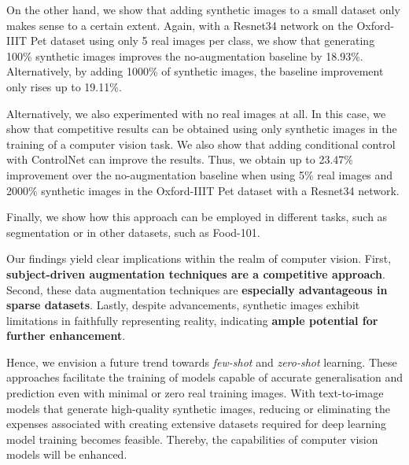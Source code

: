On the other hand, we show that adding synthetic images to a small dataset only makes sense to a certain extent. Again, with a Resnet34 network on the Oxford-IIIT Pet dataset using only 5 real images per class, we show that generating 100\% synthetic images improves the no-augmentation baseline by 18.93\%. Alternatively, by adding 1000\% of synthetic images, the baseline improvement only rises up to 19.11\%. 

Alternatively, we also experimented with no real images at all. In this case, we show that competitive results can be obtained using only synthetic images in the training of a computer vision task. We also show that adding conditional control with ControlNet can improve the results. Thus, we obtain up to 23.47\% improvement over the no-augmentation baseline when using 5\% real images and 2000\% synthetic images in the Oxford-IIIT Pet dataset with a Resnet34 network. 

Finally, we show how this approach can be employed in different tasks, such as segmentation or in other datasets, such as Food-101.

Our findings yield clear implications within the realm of computer vision. First, \textbf{subject-driven augmentation techniques are a competitive approach}. Second, these data augmentation techniques are \textbf{especially advantageous in sparse datasets}. Lastly, despite advancements, synthetic images exhibit limitations in faithfully representing reality, indicating \textbf{ample potential for further enhancement}. 

Hence, we envision a future trend towards \textit{few-shot} and \textit{zero-shot} learning. These approaches facilitate the training of models capable of accurate generalisation and prediction even with minimal or zero real training images. With text-to-image models that generate high-quality synthetic images, reducing or eliminating the expenses associated with creating extensive datasets required for deep learning model training becomes feasible. Thereby, the capabilities of computer vision models will be enhanced.